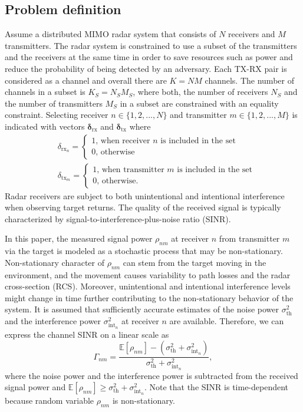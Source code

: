 \documentclass[english, 12pt, a4paper, elec, utf8, a-1b, online]{aaltothesis}
\newcommand{\E}[1]{\mathbb{E}\left[ #1 \right]}
\newcommand{\thnoise}{\sigma^2_{\text{th}}}
\newcommand{\eintnoise}{\sigma^2_{\text{int}_{n}}}
\newcommand{\esinrexp}{\Gamma_{nm}}
\newcommand{\easvtx}{\delta_{\text{tx}_m}}
\newcommand{\vasvtx}{\boldsymbol{\delta}_{\text{tx}}}
\newcommand{\easvrx}{\delta_{\text{rx}_n}}
\newcommand{\vasvrx}{\boldsymbol{\delta}_{\text{rx}}}
\newcommand{\esp}{\rho_{nm}}
\begin{document}
\subsection{Problem definition}

Assume a distributed MIMO radar system that consists of $N$ receivers and $M$ transmitters.
The radar system is constrained to use a subset of the transmitters and the receivers at the same time in order to save resources such as power and reduce the probability of being detected by an adversary.
Each TX-RX pair is considered as a channel and overall there are $K=NM$ channels.
The number of channels in a subset is $K_S = N_S M_S$, where both, the number of receivers $N_S$ and the number of transmitters $M_S$ in a subset are constrained with an equality constraint.
Selecting receiver $n \in \{1, 2, ..., N\}$ and transmitter $m \in \{1,2, ..., M\}$ is indicated with vectors $\vasvrx$ and $\vasvtx$ where
\begin{align}
    &\easvrx = 
    \left\{\begin{array}{l}
        1 \text{, when receiver $n$ is included in the set} \\
        0 \text{, otherwise}
    \end{array}\right.\\
    &\easvtx = 
    \left\{\begin{array}{l}
        1 \text{, when transmitter $m$ is included in the set} \\
        0 \text{, otherwise.}
    \end{array}\right.
\end{align}
Radar receivers are subject to both unintentional and intentional interference when observing target returns.
The quality of the received signal is typically characterized by signal-to-interference-plus-noise ratio (SINR).

In this paper, the measured signal power $\esp$ at receiver $n$ from transmitter $m$ via the target is modeled as a stochastic process that may be non-stationary. 
Non-stationary character of $\esp$ can stem from the target moving in the environment, and 
the movement causes variability to path losses and the radar cross-section (RCS).
Moreover, unintentional and intentional interference levels might change in time further contributing to the non-stationary behavior of the system.
It is assumed that sufficiently accurate estimates of the noise power $\thnoise$ and the interference power $\eintnoise$ at receiver $n$ are available.
Therefore, we can express the channel SINR on a linear scale as
\begin{equation}\label{eq:sinr}
     \esinrexp = \frac{\E{\esp} - (\thnoise + \eintnoise)}{\thnoise + \eintnoise },
\end{equation}
where the noise power and the interference power is subtracted from the received signal power and $\E{\esp} \geq \thnoise + \eintnoise$.
Note that the SINR is time-dependent because random variable $\esp$ is non-stationary. 
\end{document}
